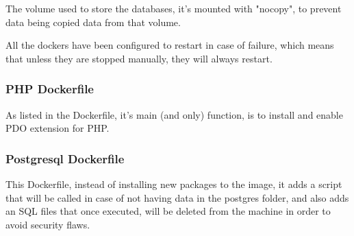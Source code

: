     \begin{flushleft}
        The volume used to store the databases, it's mounted with "nocopy", to prevent data being copied data from that volume.
    \end{flushleft}
    \begin{flushleft}
        All the dockers have been configured to restart in case of failure, which means that unless they are stopped manually,
        they will always restart.
    \end{flushleft}


    \newpage
    \subsubsection[PHP Dockerfile]{PHP Dockerfile}
    
    \begin{flushleft}
        As listed in the Dockerfile, it's main (and only) function, is to install and enable PDO extension for PHP\@.
    \end{flushleft}

    \newpage
    \subsubsection[Postgresql Dockerfile]{Postgresql Dockerfile}
    
    \begin{flushleft}
        This Dockerfile, instead of installing new packages to the image, it adds a script that will be called in case
        of not having data in the postgres folder, and also adds an SQL files that once executed, will be deleted
        from the machine in order to avoid security flaws.
    \end{flushleft}

    \newpage
    \newpage
